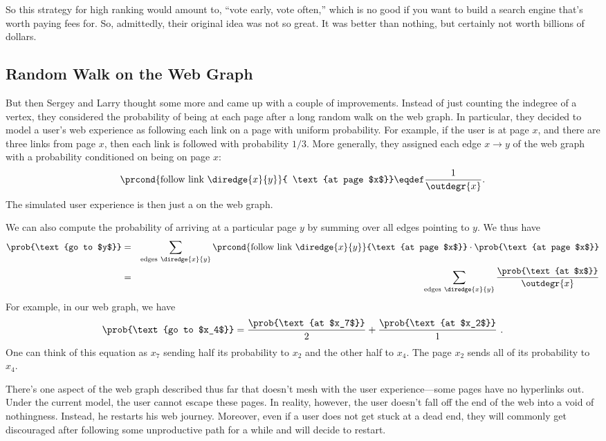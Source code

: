 So this strategy for high ranking would amount to, ``vote early, vote
often,'' which is no good if you want to build a search engine that's
worth paying fees for.  So, admittedly, their original idea was not so
great.  It was better than nothing, but certainly not worth billions of
dollars.

\subsection{Random Walk on the Web Graph}

But then Sergey and Larry thought some more and came up with a couple
of improvements.  Instead of just counting the indegree of a vertex,
they considered the probability of being at each page after a long
random walk on the web graph.  In particular, they decided to model a
user's web experience as following each link on a page with uniform
probability.  For example, if the user is at page $x$, and there are
three links from page $x$, then each link is followed with probability
$1/3$.  More generally, they assigned each edge $x \rightarrow y$ of
the web graph with a probability conditioned on being on page $x$:
\[
\prcond{\text{follow link}\ \diredge{x}{y}}{ \text{at page $x$}} \eqdef
\frac{1}{\outdegr{x}}.
\]
The simulated user experience is then just a  on the
web graph.

We can also compute the probability of arriving at a particular page $y$
by summing over all edges pointing to $y$.  We thus have
\begin{eqnarray}
  \prob{\text{go to $y$}} &=&  \sum_{\text{edges}\ \diredge{x}{y}}
  \prcond{\text{follow link}\ \diredge{x}{y}}{\text{at page $x$}} \cdot
  \prob{\text{at page $x$}} \nonumber\\
  &=& \sum_{\text{edges}\ \diredge{x}{y}} \frac{\prob{\text{at
      $x$}}}{\outdegr{x}} \label{LN12:stepprob}
\end{eqnarray}
For example, in our web graph, we have
\[ \prob{\text{go to $x_4$}} = \frac{\prob{\text{at $x_7$}}}{2} +
\frac{\prob{\text{at $x_2$}}}{1} \ .
\]
One can think of this equation as $x_7$ sending half its probability
to $x_2$ and the other half to $x_4$.  The page $x_2$ sends all of its
probability to $x_4$.

There's one aspect of the web graph described thus far that doesn't
mesh with the user experience---some pages have no hyperlinks out.
Under the current model, the user cannot escape these pages.  In
reality, however, the user doesn't fall off the end of the web into a
void of nothingness.  Instead, he restarts his web journey.  Moreover,
even if a user does not get stuck at a dead end, they will commonly get
discouraged after following some unproductive path for a while and
will decide to restart.

